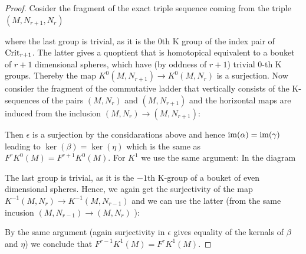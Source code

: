 \begin{proof}
	Cosider the fragment of the exact triple sequence coming from the triple $(M,N_{r+1},N_{r})$
	\begin{center}
	\end{center}where the last group is trivial, as it is the $0$th K group of the index pair of $\mathrm{Crit}_{r+1}$. The latter gives a quoptient that is homotopical equivalent to a bouket of $r+1$ dimensional spheres, which have (by oddness of $r+1$) trivial $0$-th K groups.
	Thereby the map $K^0(M,N_{r+1}) \to 	K^0(M,N_{r})$ is a surjection. Now consider the fragment of the commutative ladder that vertically consists of the K-sequences of the pairs $(M,N_r)$ and $(M,N_{r+1})$ and the horizontal maps are induced from the inclusion $(M,N_r) \to(M,N_{r+1})$:
	\begin{center}
	\end{center} Then $\epsilon$ is a surjection by the considarations above and hence $\mathrm{im}(\alpha)=\mathrm{im}(\gamma)$ leading to $\ker(\beta)=\ker(\eta)$ which is the same as $F^rK^0(M)=F^{r+1}K^0(M)$. For $K^1$ we use the same argument: In the diagram  
\begin{center}
	\end{center} The last group is trivial, as it is the $-1$th K-group of a bouket of even dimensional spheres. Hence, we again get the surjectivity of the map $	K^{-1}(M,N_{r})\to	K^{-1}(M,N_{r-1})$ and we can use the latter (from the same incusion $(M,N_{r-1}) \to(M,N_{r})$ ):
	\begin{center}
	\end{center}
	By the same argument (again surjectivity in $\epsilon$ gives equality of the kernals of $\beta$ and $\eta$) we conclude that $F^{r-1}K^1(M)=F^{r}K^1(M)$.

\end{proof}
